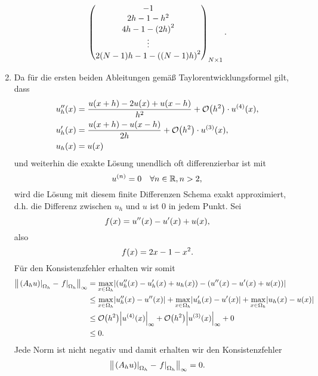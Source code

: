 \documentclass{exercise}
\begin{document}
\begin{enumerate}
\[\begin{pmatrix}
                -1\\
                2h - 1 - h^2\\
                4h - 1 - \parentheses*{2h}^2\\
                \vdots\\
                2\parentheses*{N - 1}h - 1 - \parentheses*{\parentheses*{N - 1}h}^2
            \end{pmatrix}_{N \times 1}.
        \]
        \item Da für die ersten beiden Ableitungen gemäß Taylorentwicklungsformel gilt, dass
        \begin{align*}
            u_h''\parentheses*{x} &= \frac{u\parentheses*{x + h} - 2u\parentheses*{x} + u\parentheses*{x - h}}{h^2} + \mathcal{O}\parentheses*{h^2} \cdot u^{\parentheses*{4}}\parentheses*{x},\\
            u_h'\parentheses*{x} &= \frac{u\parentheses*{x + h} - u\parentheses*{x - h}}{2h} + \mathcal{O}\parentheses*{h^2} \cdot u^{\parentheses*{3}}\parentheses*{x},\\
            u_h\parentheses*{x} &= u\parentheses*{x}
        \end{align*}
        und weiterhin die exakte Lösung unendlich oft differenzierbar ist mit
        \[
            u^{\parentheses*{n}} = 0 \quad \forall n \in \R, n > 2,
        \]
        wird die Lösung mit diesem finite Differenzen Schema exakt approximiert, d.h. die Differenz zwischen \(u_h\) und \(u\) ist \(0\) in jedem Punkt.
        Sei
        \[
            f\parentheses*{x} = u''\parentheses*{x} - u'\parentheses*{x} + u\parentheses*{x},
        \]
        also
        \[
            f\parentheses*{x} = 2x - 1 - x^2.
        \]
        Für den Konsistenzfehler erhalten wir somit
        \begin{align*}
            \norm*{\left.\parentheses*{A_h u}\right|_{\Omega_h} - \left.f\right|_{\Omega_h}}_\infty &= \max_{x \in \Omega_h}\absolute*{\parentheses*{u_h''\parentheses*{x} - u_h'\parentheses*{x} + u_h\parentheses*{x}} - \parentheses*{u''\parentheses*{x} - u'\parentheses*{x} + u\parentheses*{x}}}\\
            &\le \max_{x \in \Omega_h}\absolute*{u_h''\parentheses*{x} - u''\parentheses*{x}} + \max_{x \in \Omega_h}\absolute*{u_h'\parentheses*{x} - u'\parentheses*{x}} + \max_{x \in \Omega_h}\absolute*{u_h\parentheses*{x} - u\parentheses*{x}}\\
            &\le \mathcal{O}\parentheses*{h^2}\absolute*{u^{\parentheses*{4}}\parentheses*{x}}_\infty + \mathcal{O}\parentheses*{h^2}\absolute*{u^{\parentheses*{3}}\parentheses*{x}}_\infty + 0\\
            &\le 0.
        \end{align*}
        Jede Norm ist nicht negativ und damit erhalten wir den Konsistenzfehler
        \[
            \norm*{\left.\parentheses*{A_h u}\right|_{\Omega_h} - \left.f\right|_{\Omega_h}}_\infty = 0.
        \]
    \end{enumerate}
    
\end{document}
